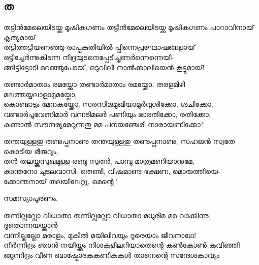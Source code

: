 \subsection{ത}
\begin{enumerate}


\begin{slokam}{\VSv}{\HM}{തട്ടിൻമേലെയിടയ്ക്കു മൂഷികഗണം}
തട്ടിൻമേലെയിടയ്ക്കു മൂഷികഗണം പാറാവിനായ് കൃത്യമായ് \\
തട്ടിത്തട്ടിയണഞ്ഞു രാപ്പകുതിയിൽ പ്പിന്നെപ്രഘോഷങ്ങളായ് \\
ഒട്ടിച്ചേർന്നുകിടന്ന നിദ്രയുടനെപ്പേടിച്ചുണർന്നെന്നെയി- \\
ങ്ങിട്ടിട്ടോടി മറഞ്ഞുപോയ്, ഒടുവിലീ നാൽക്കാലിയെൻ കൂട്ടുമായ്!
\end{slokam}




\begin{slokam}{\VSr}{\CN}{തണ്ടാർമാതാം രമയ്ക്കോ}
തണ്ടാർമാതാം രമയ്ക്കോ, തരളമിഴി മലത്തയ്യലാളാമുമയ്ക്കോ,\\
കൊണ്ടാടും മേനകയ്ക്കോ, സരസിജമുഖിയാമുർവ്വശിക്കോ, ശചിക്കോ,\\
വണ്ടാർപൂവേണിമാർ വന്നടിമലർ പണിയും ഭാരതിക്കോ, രതിക്കോ,\\
കണ്ടാൽ സൗന്ദര്യമേറുന്നതു മമ പനയഞ്ചേരി നാരായണിക്കോ?
\end{slokam}


\begin{slokam}{\VKm}{\UN}{തന്തയുള്ളതു തണുപ്പനാണു}
തന്തയുള്ളതു തണുപ്പനാണു, സഹജൻ സ്വതേ കൊടിയ ഭീരുവും,\\
തൻ തലയ്ക്കസുഖമുള്ള രണ്ടു സുതർ, പാമ്പു മാത്രമണിയാനുമേ,\\
കാന്തനോ ചുടലവാസി, തെണ്ടി, വിഷമാണു ഭക്ഷണ, മൊരുത്തിയെ-\\
ക്കോന്തനായ് തലയിലേറ്റു, മെന്റെ !
\end{slokam}



സമസ്യാപൂരണം. 


\begin{slokam}{\VSr}{\KJ}{തന്നില്ലല്ലോ വിധാതാ}
തന്നില്ലല്ലോ വിധാതാ മധുരിമ മമ വാക്കിന്നു, ദൂതൊന്നയയ്ക്കാൻ\\
വന്നില്ലല്ലോ മരാളം, മുകിൽ മയിലിവയും ദൂരെയാം ജീവനാഥേ!\\
നിർന്നിദ്രം ഞാൻ നയിയ്ക്കും നിശകളിലറിയാതെന്റെ കൺകോൺ കവിഞ്ഞി-\\
ങ്ങുന്നിദ്രം വീണ ബാഷ്പോദകകണികകൾ താനെന്റെ സന്ദേശകാവ്യം
\end{slokam}


\end{enumerate}
